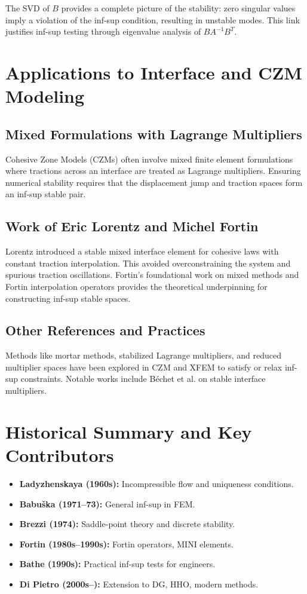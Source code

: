\documentclass[11pt]{article}
\begin{document}
The SVD of $B$ provides a complete picture of the stability: zero singular values imply a violation of the inf-sup condition, resulting in unstable modes. This link justifies inf-sup testing through eigenvalue analysis of $B A^{-1} B^T$.

\section{Applications to Interface and CZM Modeling}
\subsection{Mixed Formulations with Lagrange Multipliers}
Cohesive Zone Models (CZMs) often involve mixed finite element formulations where tractions across an interface are treated as Lagrange multipliers. Ensuring numerical stability requires that the displacement jump and traction spaces form an inf-sup stable pair.

\subsection{Work of Eric Lorentz and Michel Fortin}
Lorentz introduced a stable mixed interface element for cohesive laws with constant traction interpolation. This avoided overconstraining the system and spurious traction oscillations. Fortin's foundational work on mixed methods and Fortin interpolation operators provides the theoretical underpinning for constructing inf-sup stable spaces.

\subsection{Other References and Practices}
Methods like mortar methods, stabilized Lagrange multipliers, and reduced multiplier spaces have been explored in CZM and XFEM to satisfy or relax inf-sup constraints. Notable works include Béchet et al. on stable interface multipliers.

\section{Historical Summary and Key Contributors}
\begin{itemize}[itemsep=0.5em]
  \item \textbf{Ladyzhenskaya (1960s):} Incompressible flow and uniqueness conditions.
  \item \textbf{Babu\v{s}ka (1971--73):} General inf-sup in FEM.
  \item \textbf{Brezzi (1974):} Saddle-point theory and discrete stability.
  \item \textbf{Fortin (1980s--1990s):} Fortin operators, MINI elements.
  \item \textbf{Bathe (1990s):} Practical inf-sup tests for engineers.
  \item \textbf{Di Pietro (2000s--):} Extension to DG, HHO, modern methods.
\end{itemize}
\end{document}

